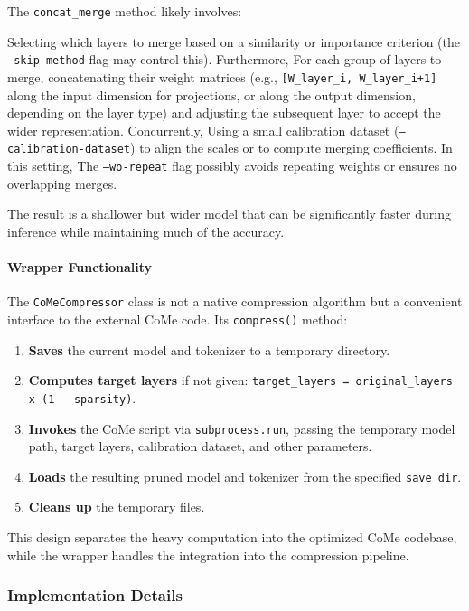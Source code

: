 The \texttt{concat\_merge} method likely involves:

Selecting which layers to merge based on a similarity or importance criterion (the \texttt{--skip-method} flag may control this). Furthermore, For each group of layers to merge, concatenating their weight matrices (e.g., \texttt{[W\_layer\_i, W\_layer\_i+1]} along the input dimension for projections, or along the output dimension, depending on the layer type) and adjusting the subsequent layer to accept the wider representation. Concurrently, Using a small calibration dataset (\texttt{--calibration-dataset}) to align the scales or to compute merging coefficients. In this setting, The \texttt{--wo-repeat} flag possibly avoids repeating weights or ensures no overlapping merges.


The result is a shallower but wider model that can be significantly faster during inference while maintaining much of the accuracy.

\paragraph{Wrapper Functionality}

The \texttt{CoMeCompressor} class is not a native compression algorithm but a convenient interface to the external CoMe code. Its \texttt{compress()} method:

\begin{enumerate}
\item \textbf{Saves} the current model and tokenizer to a temporary directory.
\item \textbf{Computes target layers} if not given: \texttt{target\_layers = original\_layers x (1 - sparsity)}.
\item \textbf{Invokes} the CoMe script via \texttt{subprocess.run}, passing the temporary model path, target layers, calibration dataset, and other parameters.
\item \textbf{Loads} the resulting pruned model and tokenizer from the specified \texttt{save\_dir}.
\item \textbf{Cleans up} the temporary files.

\end{enumerate}
This design separates the heavy computation into the optimized CoMe codebase, while the wrapper handles the integration into the compression pipeline.


\subsubsection*{Implementation Details}

